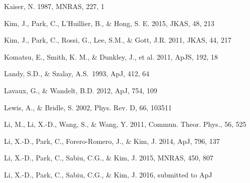 \documentclass[iop]{emulateapj}
\begin{document}
\begin{thebibliography}{}
Kaiser, N. 1987, MNRAS, 227, 1




Kim, J., Park, C., L'Huillier, B., \& Hong, S. E. 2015, JKAS, 48, 213

Kim, J., Park, C., Rossi, G., Lee, S.M., \& Gott, J.R. 2011, JKAS, 44, 217  


Komatsu, E., Smith, K. M., \& Dunkley, J., et al. 2011, ApJS, 192, 18  



Landy, S.D., \& Szalay, A.S.\ 1993, ApJ, 412, 64 


Lavaux, G., \& Wandelt, B.D. 2012, ApJ, 754, 109  


Lewis, A., \& Bridle, S. 2002, Phys. Rev. D, 66, 103511


Li, M., Li, X.-D., Wang, S., \& Wang, Y. 2011, Commun. Theor. Phys., 56, 525

Li, X.-D., Park, C., Forero-Romero, J., \& Kim, J. 2014, ApJ, 796, 137

Li, X.-D., Park, C., Sabiu, C.G., \& Kim, J. 2015, MNRAS, 450, 807 

Li, X.-D., Park, C., Sabiu, C.G., \& Kim, J. 2016, submitted to ApJ



\end{thebibliography}
\end{document}
